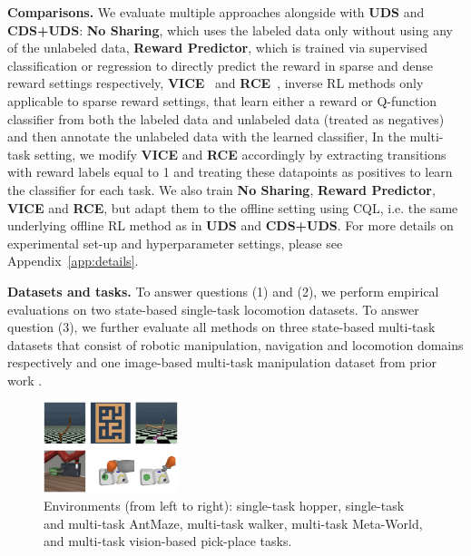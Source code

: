 \textbf{Comparisons.} 
We evaluate multiple approaches alongside with \textbf{UDS} and \textbf{CDS+UDS}:
\textbf{No Sharing}, which uses the labeled data only without using any of the unlabeled data, \textbf{Reward Predictor}, which is trained via supervised classification or regression to directly predict the reward in sparse and dense reward settings respectively, \textbf{VICE}~\citep{fu2018variational} and \textbf{RCE}~\citep{eysenbach2021replacing}, inverse RL methods only applicable to sparse reward settings, that learn either a reward or Q-function classifier from both the labeled data and unlabeled data (treated as negatives) and then annotate the unlabeled data with the learned classifier, 
In the multi-task setting, we modify \textbf{VICE} and \textbf{RCE} accordingly by extracting transitions with reward labels equal to 1 and treating these datapoints as positives to learn the classifier for each task. We also train \textbf{No Sharing}, \textbf{Reward Predictor}, \textbf{VICE} and \textbf{RCE}, but adapt them to the offline setting using CQL, i.e. the same underlying offline RL method as in \textbf{UDS} and \textbf{CDS+UDS}.
For more details on experimental set-up and hyperparameter settings, please see Appendix~\ref{app:details}. 

\textbf{Datasets and tasks.} To answer questions (1) and (2), we perform empirical evaluations on two state-based single-task locomotion datasets. To answer question (3), we further evaluate all methods on three state-based multi-task datasets that consist of robotic manipulation, navigation and locomotion domains respectively and one image-based multi-task manipulation dataset from prior work \citep{yu2021conservative}.

\begin{figure}[ht]
    \centering
    \includegraphics[width=0.35\textwidth]{chapters/uds/env.png}
    \vspace{-0.33cm}
    \caption{\footnotesize  Environments (from left to right):  single-task hopper, single-task and multi-task AntMaze, multi-task walker, multi-task Meta-World, and multi-task vision-based pick-place tasks.}
    \vspace{-0.35cm}
    \label{fig:env}
\end{figure}

